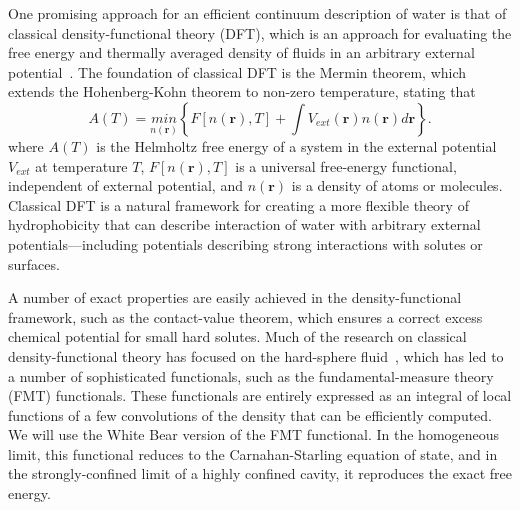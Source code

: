 \documentclass[letterpaper,twocolumn,amsmath,amssymb,prb]{revtex4-1}
\newcommand{\rr}{\textbf{r}}
\begin{document}
One promising approach for an efficient continuum description of water
is that of classical density-functional theory (DFT), which is an
approach for evaluating the free energy and thermally averaged density
of fluids in an arbitrary external potential~\cite{ebner1976density}.
The foundation of classical DFT is the Mermin
theorem\cite{mermin1965thermal}, which extends the Hohenberg-Kohn
theorem\cite{hohenberg1964inhomogeneous} to non-zero temperature,
stating that
\begin{equation}
  A(T) = \underset{n(\rr)}{min}\left\{ F[n(\rr),T] + \int V_\textit{ext}(\rr) n(\rr)
d\rr\right\}.
\end{equation}
where $A(T)$ is the Helmholtz free energy of a system in the external
potential $V_\textit{ext}$ at temperature $T$, $F[n(\rr),T]$ is a
universal free-energy functional, independent of external potential,
and $n(\rr)$ is a density of atoms or molecules.  Classical DFT is a
natural framework for creating a more flexible theory of
hydrophobicity that can describe interaction of water with arbitrary
external potentials---including potentials describing strong
interactions with solutes or surfaces.

A number of exact properties are easily achieved in the
density-functional framework, such as the contact-value theorem, which
ensures a correct excess chemical potential for small hard solutes.
Much of the research on classical density-functional theory has
focused on the hard-sphere fluid~\cite{curtin1985, rosenfeld1989,
  rosenfeld1993, rosenfeld1997, tarazona1997, tarazona2000}, which has
led to a number of sophisticated functionals, such as the
fundamental-measure theory (FMT) functionals\cite{rosenfeld1989,
  rosenfeld1993, rosenfeld1997, tarazona1997, tarazona2000,
  roth2002whitebear}.  These functionals are entirely expressed as an integral of
local functions of a few convolutions of the density that can be
efficiently computed.  We will use the White Bear version of the FMT
functional\cite{roth2002whitebear}.  In the homogeneous limit, this
functional reduces to the Carnahan-Starling equation of state, and in
the strongly-confined limit of a highly confined cavity, it reproduces
the exact free energy.
\end{document}
